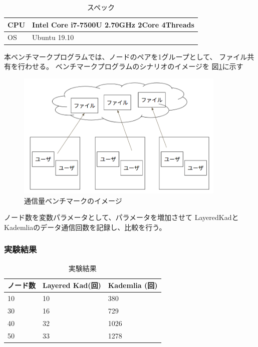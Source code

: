 \documentclass[sotsuron]{jcsie}
\begin{document}
\begin{table}[H]
	\caption{スペック}	
	\centering
	\label{table:spec-note}
	\begin{tabular}{|l|l|}
		\hline
		CPU &   
		Intel Core i7-7500U 2.70GHz 2Core 4Threads\\ 
		\hline	
		OS  &   
		Ubuntu 19.10 \\ 
		\hline
	\end{tabular}	
\end{table}

本ベンチマークプログラムでは、ノードのペアを1グループとして、
ファイル共有を行わせる。
ベンチマークプログラムのシナリオのイメージを
図\ref{fig:trafficBenchmark}に示す

\begin{figure}[H]
	\centering
	\includegraphics[width=10cm]{./assets/image/traffic_benchmark.png}
	\caption{通信量ベンチマークのイメージ}
	\label{fig:trafficBenchmark}
\end{figure}

ノード数を変数パラメータとして、パラメータを増加させて
LayeredKadとKademliaのデータ通信回数を記録し、比較を行う。

\subsubsection{実験結果}

\begin{table}[H]
	\caption{実験結果}	
	\centering
	\label{table:traffic-result}
	\begin{tabular}{|l|l|l|}
		\hline
		ノード数     &   
		Layered Kad(回) &   
		Kademlia (回)\\ 
		\hline
		10               &   
		10               &   
		380\\
		\hline
		30               &   
		16               &   
		729\\
		\hline
		40               &   
		32               &   
		1026\\
		\hline
		50               &   
		33               &   
		1278\\
		\hline
	\end{tabular}	
\end{table}
\end{document}
